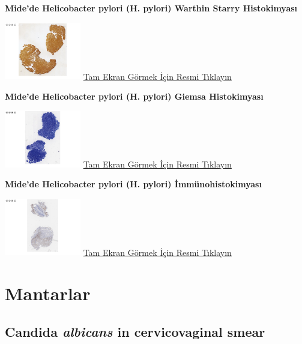 \documentclass[
  letterpaper,
  DIV=11,
  numbers=noendperiod]{scrreprt}
\begin{document}
\textbf{Mide'de Helicobacter pylori (H. pylori) Warthin Starry
Histokimyası}

\href{https://images.patolojiatlasi.com/helicobacterpylori/warthinstarry.html}{\includegraphics[width=0.25\textwidth,height=\textheight]{./screenshots/helicobacterpyloriWS_screenshot.png}}
\href{https://images.patolojiatlasi.com/helicobacterpylori/warthinstarry.html}{Tam
Ekran Görmek İçin Resmi Tıklayın}

\textbf{Mide'de Helicobacter pylori (H. pylori) Giemsa Histokimyası}

\href{https://images.patolojiatlasi.com/helicobacterpylori/giemsa.html}{\includegraphics[width=0.25\textwidth,height=\textheight]{./screenshots/helicobacterpyloriGiemsa_screenshot.png}}
\href{https://images.patolojiatlasi.com/helicobacterpylori/giemsa.html}{Tam
Ekran Görmek İçin Resmi Tıklayın}

\textbf{Mide'de Helicobacter pylori (H. pylori) İmmünohistokimyası}

\href{https://images.patolojiatlasi.com/helicobacterpylori/IHC.html}{\includegraphics[width=0.25\textwidth,height=\textheight]{./screenshots/helicobacterpyloriIHC_screenshot.png}}
\href{https://images.patolojiatlasi.com/helicobacterpylori/IHC.html}{Tam
Ekran Görmek İçin Resmi Tıklayın}

\hypertarget{sec-mantarlar}{%
\chapter{Mantarlar}\label{sec-mantarlar}}

\hypertarget{sec-candida-albicans-in-cervicovaginal-smear}{%
\section{\texorpdfstring{Candida \emph{albicans} in cervicovaginal
smear}{Candida albicans in cervicovaginal smear}}\label{sec-candida-albicans-in-cervicovaginal-smear}}
\end{document}
